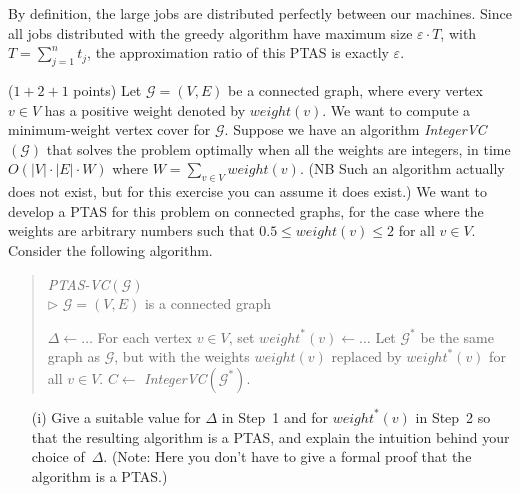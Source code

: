 \documentclass{article}
\newcommand{\G}{\ensuremath{\mathcal{G}}}
\newcommand{\graph}{\G}
\newcommand{\eps}{\varepsilon}
\renewcommand{\leq}{\leqslant}
\newcommand{\weight}{\mathit{weight}}
\newcounter{rcounter}
\newenvironment{rlist}%
{\begin{list}{\setnr-\arabic{rcounter}}{\usecounter{rcounter}}}{\end{list}}
\begin{document}
\begin{rlist}
\begin{enumerate}
            By definition, the large jobs are distributed perfectly between our machines. Since all jobs distributed with the greedy algorithm have maximum size $\eps \cdot T$, with $T=\sum_{j=1}^{n}t_j$, the approximation ratio of this PTAS is exactly $\eps$.
        \end{enumerate}
        \item ($1 + 2 + 1$ points)
        Let $\graph=(V,E)$ be a connected graph, where every vertex $v\in V$ 
        has a positive weight denoted by $\weight(v)$. We want to compute a 
        minimum-weight vertex cover for $\graph$.
        Suppose we have an algorithm \emph{IntegerVC}$(\graph)$ that solves the problem optimally when all the weights are integers, in time $O( |V|\cdot |E|\cdot W)$ where $W = \sum_{v\in V} \weight(v)$.
        (NB Such an algorithm actually does not exist, but for this exercise you can assume it does exist.)
        We want to develop a PTAS for this problem on connected graphs, for the case where the weights are arbitrary numbers such that $0.5 \leq \weight(v) \leq 2$ for all $v\in V$.
        Consider the following algorithm.
        \begin{algorithm}
            \vspace*{2mm}
            \begin{quotation}
                \noindent
                \emph{PTAS-VC}$(\graph)$ \\
                $\rhd$ $\graph=(V,E)$ is a connected graph \\[-5mm]
                \begin{algorithmic}[1]
                    \State $\Delta \gets \ldots$
                    \State For each vertex $v\in V$, set $\weight^*(v) \gets \ldots$
                    \State Let $\graph^*$ be the same graph as $\graph$, but with the weights $\weight(v)$
                    replaced by $\weight^*(v)$ for all $v\in V$.
                    \State $C  \gets$ \emph{IntegerVC}$(\graph^*)$.
                \end{algorithmic}
            \end{quotation}
        \end{algorithm}
        \begin{enumerate}
            \item[(i)] Give a suitable value for $\Delta$ in Step~1 and for $\weight^*(v)$
            in Step~2 so that the resulting algorithm is a PTAS, and explain the intuition behind your choice of~$\Delta$. (Note: Here you don't have to give a formal proof 
            that the algorithm is a PTAS.)
            

\end{enumerate}
\end{rlist}
\end{document}
